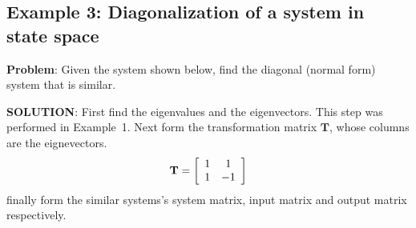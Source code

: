 \subsection*{Example 3: Diagonalization of a system in state space} %
\label{ssub:example_2}
\textbf{Problem}: Given the system shown below, find the diagonal (normal form) system that is similar.



\textbf{SOLUTION}: First find the eigenvalues and the eigenvectors. This step was performed in Example~1. Next form the transformation matrix $\mathbf{T}$, whose columns are the eignevectors.
\[
{\bf{T}} = \left[ {\begin{array}{*{20}c}
   1 & 1  \\
   1 & { - 1}  \\
\end{array}} \right]
\]
finally form the similar systems's system matrix, input matrix and output matrix respectively.
